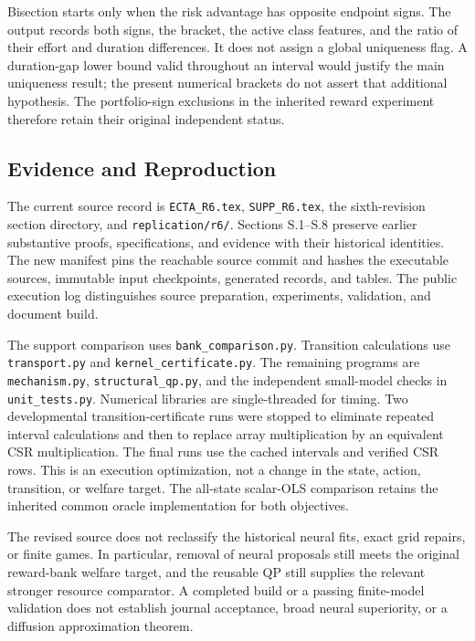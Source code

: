 Bisection starts only when the risk advantage has opposite endpoint signs. The output records both signs, the bracket, the active class features, and the ratio of their effort and duration differences. It does not assign a global uniqueness flag. A duration-gap lower bound valid throughout an interval would justify the main uniqueness result; the present numerical brackets do not assert that additional hypothesis. The portfolio-sign exclusions in the inherited reward experiment therefore retain their original independent status.

\subsection{Evidence and Reproduction}
The current source record is \texttt{ECTA\_R6.tex}, \texttt{SUPP\_R6.tex}, the sixth-revision section directory, and \texttt{replication/r6/}. Sections S.1--S.8 preserve earlier substantive proofs, specifications, and evidence with their historical identities. The new manifest pins the reachable source commit and hashes the executable sources, immutable input checkpoints, generated records, and tables. The public execution log distinguishes source preparation, experiments, validation, and document build.

The support comparison uses \texttt{bank\_comparison.py}. Transition calculations use \texttt{transport.py} and \texttt{kernel\_certificate.py}. The remaining programs are \texttt{mechanism.py}, \texttt{structural\_qp.py}, and the independent small-model checks in \texttt{unit\_tests.py}. Numerical libraries are single-threaded for timing. Two developmental transition-certificate runs were stopped to eliminate repeated interval calculations and then to replace array multiplication by an equivalent CSR multiplication. The final runs use the cached intervals and verified CSR rows. This is an execution optimization, not a change in the state, action, transition, or welfare target. The all-state scalar-OLS comparison retains the inherited common oracle implementation for both objectives.

The revised source does not reclassify the historical neural fits, exact grid repairs, or finite games. In particular, removal of neural proposals still meets the original reward-bank welfare target, and the reusable QP still supplies the relevant stronger resource comparator. A completed build or a passing finite-model validation does not establish journal acceptance, broad neural superiority, or a diffusion approximation theorem.
